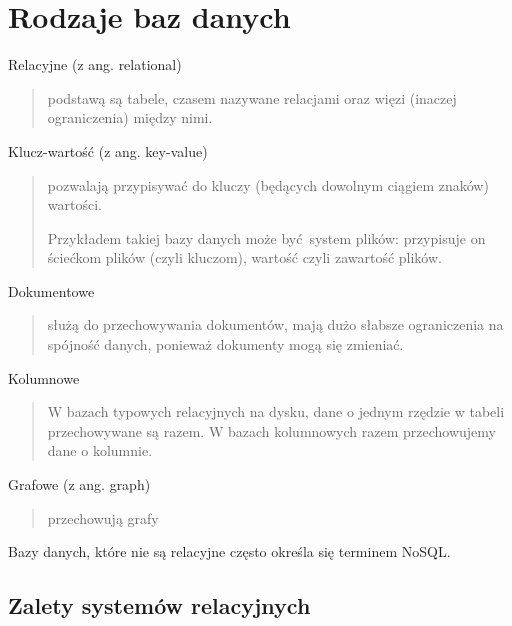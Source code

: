 \documentclass[a4paper]{article}
\begin{document}
\section{Rodzaje baz danych%
  \label{rodzaje-baz-danych}%
}

Relacyjne (z ang. relational)
%
\begin{quote}

podstawą są tabele, czasem nazywane relacjami oraz więzi
(inaczej ograniczenia) między nimi.

\end{quote}

Klucz-wartość (z ang. key-value)
%
\begin{quote}

pozwalają przypisywać do kluczy (będących dowolnym ciągiem znaków) wartości.

Przykładem takiej bazy danych może być~system plików:
przypisuje on ściećkom plików (czyli kluczom), wartość czyli zawartość
plików.

\end{quote}

Dokumentowe
%
\begin{quote}

służą do przechowywania dokumentów, mają dużo
słabsze ograniczenia na spójność danych, ponieważ dokumenty
mogą się zmieniać.

\end{quote}

Kolumnowe
%
\begin{quote}

W bazach typowych relacyjnych na dysku, dane o jednym
rzędzie w tabeli przechowywane są razem. W bazach kolumnowych
razem przechowujemy dane o kolumnie.

\end{quote}

Grafowe (z ang. graph)
%
\begin{quote}

przechowują grafy

\end{quote}

Bazy danych, które nie są relacyjne często określa się terminem
NoSQL.


\subsection{Zalety systemów relacyjnych%
  \label{zalety-systemow-relacyjnych}%
}
\end{document}
